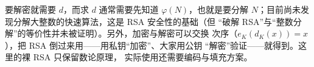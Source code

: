 \begin{remark}[安全性与数字签名]
要解密就需要 $d$，而求 $d$ 通常需要先知道 $\varphi(N)$，也就是要分解
$N$；目前尚未发现分解大整数的快速算法，这是 RSA 安全性的基础（但
“破解 RSA”与“整数分解”的等价性并未被证明）。另外，加密与解密可以交换
次序（$e_K(d_K(x))=x$），把 RSA 倒过来用——用私钥“加密”、大家用公钥
“解密”验证——就得到。这里的裸 RSA 只保留数论原理，
实际使用还需要编码与填充方案。
\end{remark}
